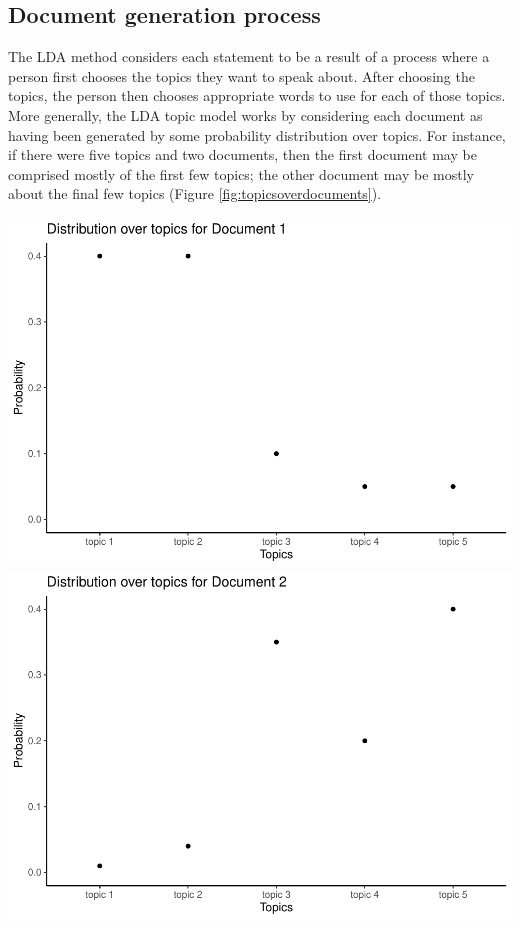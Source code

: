 \documentclass[
]{book}
\begin{document}
\hypertarget{document-generation-process}{%
\subsection{Document generation process}\label{document-generation-process}}

The LDA method considers each statement to be a result of a process where a person first chooses the topics they want to speak about. After choosing the topics, the person then chooses appropriate words to use for each of those topics. More generally, the LDA topic model works by considering each document as having been generated by some probability distribution over topics. For instance, if there were five topics and two documents, then the first document may be comprised mostly of the first few topics; the other document may be mostly about the final few topics (Figure \ref{fig:topicsoverdocuments}).

\includegraphics{telling_stories_with_data_files/figure-latex/topicsoverdocuments-1.pdf} \includegraphics{telling_stories_with_data_files/figure-latex/topicsoverdocuments-2.pdf}
\end{document}
